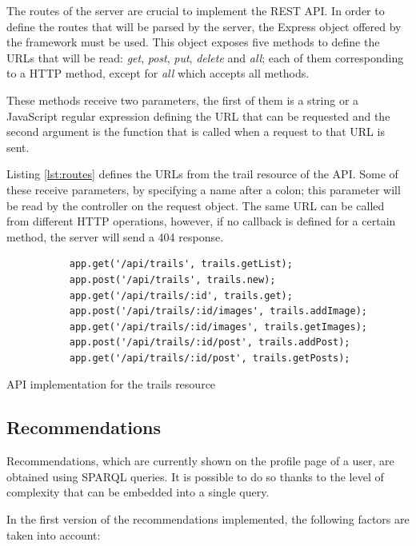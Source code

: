 The routes of the server are crucial to implement the REST API. In order to define the routes that will be parsed by the server, the Express object offered by the framework must be used. This object exposes five methods to define the URLs that will be read: \textit{get}, \textit{post}, \textit{put}, \textit{delete} and \textit{all}; each of them corresponding to a HTTP method, except for \textit{all} which accepts all methods.

These methods receive two parameters, the first of them is a string or a JavaScript regular expression defining the URL that can be requested and the second argument is the function that is called when a request to that URL is sent.

Listing \ref{lst:routes} defines the URLs from the trail resource of the API. Some of these receive parameters, by specifying a name after a colon; this parameter will be read by the controller on the request object. The same URL can be called from different HTTP operations, however, if no callback is defined for a certain method, the server will send a 404 response.

\begin{listing}[ht]\centering
  \begin{minipage}{.7\textwidth}
    \begin{verbatim}
           app.get('/api/trails', trails.getList);
           app.post('/api/trails', trails.new);
           app.get('/api/trails/:id', trails.get);
           app.post('/api/trails/:id/images', trails.addImage);
           app.get('/api/trails/:id/images', trails.getImages);
           app.post('/api/trails/:id/post', trails.addPost);
           app.get('/api/trails/:id/post', trails.getPosts);
    \end{verbatim}
  \end{minipage}
  \caption{API implementation for the trails resource}\label{lst:routes}
\end{listing}

\subsection{Recommendations}

Recommendations, which are currently shown on the profile page of a user, are obtained using SPARQL queries. It is possible to do so thanks to the level of complexity that can be embedded into a single query.

In the first version of the recommendations implemented, the following factors are taken into account:

